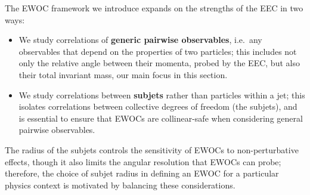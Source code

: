 



The EWOC framework we introduce expands on the strengths of the EEC in two ways:
\begin{itemize}
    \item
        We study correlations of \textbf{generic pairwise observables}, i.e.~any observables that depend on the properties of two particles;
        this includes not only the relative angle between their momenta, probed by the EEC, but also their total invariant mass, our main focus in this section.

    \item
        We study correlations between \textbf{subjets} rather than particles within a jet;
        this isolates correlations between collective degrees of freedom (the subjets), and is essential to ensure that EWOCs are collinear-safe when considering general pairwise observables.
\end{itemize}
%
The radius of the subjets controls the sensitivity of EWOCs to non-perturbative effects, though it also limits the angular resolution that EWOCs can probe;
%
therefore, the choice of subjet radius in defining an EWOC for a particular physics context is motivated by balancing these considerations.

